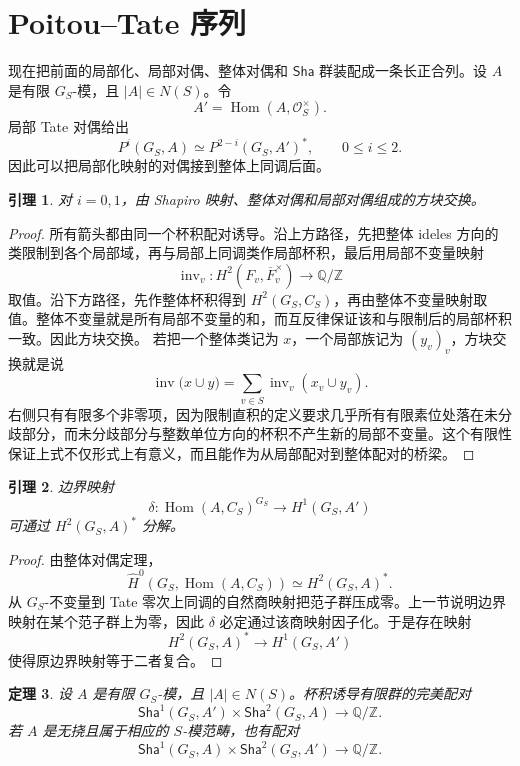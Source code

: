 \documentclass[11pt,a4paper,openany]{ctexbook}
\numberwithin{equation}{chapter}
\newcommand{\Q}{\mathbb{Q}}
\newcommand{\Z}{\mathbb{Z}}
\newcommand{\Hom}{\operatorname{Hom}}
\newcommand{\Sha}{\mathsf{Sha}}
\theoremstyle{plain}
\newtheorem{theorem}{定理}[chapter]
\newtheorem{lemma}[theorem]{引理}
\theoremstyle{definition}
\theoremstyle{remark}
\begin{document}
\section{Poitou--Tate 序列}

现在把前面的局部化、局部对偶、整体对偶和 $\Sha$ 群装配成一条长正合列。设 $A$ 是有限 $G_S$-模，且 $|A|\in N(S)$。令
\[
A'=\Hom(A,\mathcal O_S^\times).
\]
局部 Tate 对偶给出
\[
P^i(G_S,A)\simeq P^{2-i}(G_S,A')^*,\qquad 0\leq i\leq 2.
\]
因此可以把局部化映射的对偶接到整体上同调后面。

\begin{lemma}
对 $i=0,1$，由 Shapiro 映射、整体对偶和局部对偶组成的方块交换。
\end{lemma}

\begin{proof}
所有箭头都由同一个杯积配对诱导。沿上方路径，先把整体 ideles 方向的类限制到各个局部域，再与局部上同调类作局部杯积，最后用局部不变量映射
\[
\operatorname{inv}_v:H^2(F_v,\overline F_v^\times)\to \Q/\Z
\]
取值。沿下方路径，先作整体杯积得到 $H^2(G_S,C_S)$，再由整体不变量映射取值。整体不变量就是所有局部不变量的和，而互反律保证该和与限制后的局部杯积一致。因此方块交换。
若把一个整体类记为 $x$，一个局部族记为 $(y_v)_v$，方块交换就是说
\[
\operatorname{inv}\bigl(x\cup y\bigr)=\sum_{v\in S}\operatorname{inv}_v(x_v\cup y_v).
\]
右侧只有有限多个非零项，因为限制直积的定义要求几乎所有有限素位处落在未分歧部分，而未分歧部分与整数单位方向的杯积不产生新的局部不变量。这个有限性保证上式不仅形式上有意义，而且能作为从局部配对到整体配对的桥梁。
\end{proof}

\begin{lemma}
边界映射
\[
\delta:\Hom(A,C_S)^{G_S}\to H^1(G_S,A')
\]
可通过 $H^2(G_S,A)^*$ 分解。
\end{lemma}

\begin{proof}
由整体对偶定理，
\[
\widehat H^0(G_S,\Hom(A,C_S))\simeq H^2(G_S,A)^*.
\]
从 $G_S$-不变量到 Tate 零次上同调的自然商映射把范子群压成零。上一节说明边界映射在某个范子群上为零，因此 $\delta$ 必定通过该商映射因子化。于是存在映射
\[
H^2(G_S,A)^*\longrightarrow H^1(G_S,A')
\]
使得原边界映射等于二者复合。
\end{proof}

\begin{theorem}
设 $A$ 是有限 $G_S$-模，且 $|A|\in N(S)$。杯积诱导有限群的完美配对
\[
\Sha^1(G_S,A')\times \Sha^2(G_S,A)\longrightarrow \Q/\Z.
\]
若 $A$ 是无挠且属于相应的 $S$-模范畴，也有配对
\[
\Sha^1(G_S,A)\times \Sha^2(G_S,A')\longrightarrow \Q/\Z.
\]
\end{theorem}
\end{document}
